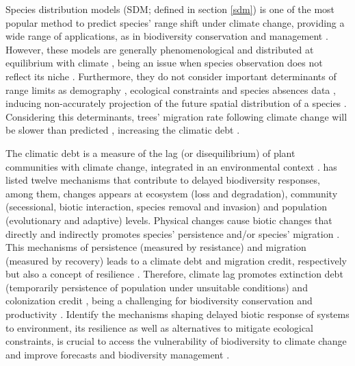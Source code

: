 Species distribution models (SDM; defined in section \ref{sdm}) is one of the most popular method to predict species' range shift under climate change, providing a wide range of applications, as in biodiversity conservation and management \parencite{Guisan2005,Guisan2013}.
However, these models are generally phenomenological and  distributed at equilibrium with climate \parencite[e.g.][]{Pigot2013}, being an issue when species observation does not reflect its niche \parencite{Schurr2012}.
Furthermore, they do not consider important determinants of range limits as demography \parencite{Louthan2015}, ecological constraints \parencite{Wisz2013,Pigot2013} and species absences data \parencite{Koshkina2017}, inducing non-accurately projection of the future spatial distribution of a species \parencite{Tavecchia2016}.
Considering this determinants, trees' migration rate following climate change will be slower than predicted \parencite{Bertrand2011,Sittaro2017}, increasing the climatic debt \parencite{Bertrand2016}.

The climatic debt is a measure of the lag (or disequilibrium) of plant communities with climate change, integrated in an environmental context \parencite{Bertrand2016}.
\textcite{Essl2015} has listed twelve mechanisms that contribute to delayed biodiversity responses, among them, changes appears at ecosystem (loss and degradation), community (secessional, biotic interaction, species removal and invasion) and population (evolutionary and adaptive) levels.
Physical changes cause biotic changes that directly and indirectly promotes species' persistence and/or species' migration \parencite{Bertrand2016}.
This mechanisms of persistence (measured by resistance) and migration (measured by recovery) leads to a climate debt and migration credit, respectively \parencite{Bertrand2016} but also a concept of resilience\footnotemark{} \parencite{Oliver2015}.
Therefore, climate lag promotes extinction debt (temporarily persistence of population under unsuitable conditions) and colonization credit \parencite[suitable locations are not occupied due species constraints;][]{talluto2017}, being a challenging for biodiversity conservation \parencite{Kuussaari2009} and productivity \parencite{Lasch2002}.
Identify the mechanisms shaping delayed biotic response of systems to environment, its resilience as well as alternatives to mitigate ecological constraints, is crucial to access the vulnerability of biodiversity to climate change and improve forecasts and biodiversity management \parencite{Essl2015,Oliver2015,Bertrand2016}.


